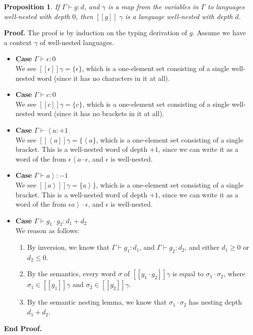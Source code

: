 \documentclass{article}
\newcommand{\lft}[1]{\left<{#1}\right.}
\newcommand{\rgt}[1]{\left.{#1}\right>}
\newcommand{\judgebalance}[3][\Gamma]{{#1} \vdash {#2} : {#3}}
\newcommand{\interp}[1]{[\![{#1}]\!]}
\newcommand{\setof}[1]{\{{#1}\}}
\newtheorem{prop}{Proposition}
\newenvironment{proof}{\noindent\textbf{Proof.}}
{\noindent\textbf{End Proof.}}
\newenvironment{caseblock}{\begin{itemize}}{\end{itemize}}
\newenvironment{case}[1]{\item \textbf{Case} {#1}\\}{}
\begin{document}
\begin{prop}
If $\judgebalance{g}{d}$, and $\gamma$ is a map from the variables in $\Gamma$ to 
languages well-nested with depth $0$, then $\interp{g}\;\gamma$ is a language well-nested 
with depth $d$. 
\end{prop}

\begin{proof}
The proof is by induction on the typing derivation of $g$. Assume we have a context $\gamma$ of well-nested
languages.

\begin{caseblock}
  \begin{case}{$\judgebalance{\epsilon}{0}$}
    We see $\interp{\epsilon}{\gamma} = \setof{\epsilon}$, which is a one-element set consisting 
    of a single well-nested word (since it has no characters in it at all). 
  \end{case}

  \begin{case}{$\judgebalance{c}{0}$}
    We see $\interp{c}{\gamma} = \setof{c}$, which is a one-element set consisting 
    of a single well-nested word (since it has no brackets in it at all). 
  \end{case}

  \begin{case}{$\judgebalance{\lft{a}}{+1}$}
    We see $\interp{\lft{a}}{\gamma} = \setof{\lft{a}}$, which is a one-element set consisting 
    of a single bracket. This is a well-nested word of depth $+1$, since we can write it as a 
    word of the from $\epsilon\lft{a}\cdot\epsilon$, and $\epsilon$ is well-nested. 
  \end{case}

  \begin{case}{$\judgebalance{\rgt{a}}{-1}$}
    We see $\interp{\rgt{a}}{\gamma} = \setof{\rgt{a}}$, which is a one-element set consisting 
    of a single bracket. This is a well-nested word of depth $+1$, since we can write it as a 
    word of the from $\epsilon\rgt{a}\cdot\epsilon$, and $\epsilon$ is well-nested. 
   \end{case}

  \begin{case}{$\judgebalance{g_1\cdot g_2}{d_1 + d_2}$}
    We reason as follows: 
    \begin{enumerate}
      \item By inversion, we know that $\judgebalance{g_1}{d_1}$, and $\judgebalance{g_2}{d_2}$, and either
        $d_1 \geq 0$ or $d_2 \leq 0$. 
      \item By the semantics, every word $\sigma$ of $\interp{g_1\cdot g_2}\gamma$ is equal to 
        $\sigma_1\cdot\sigma_2$, where $\sigma_1 \in \interp{g_1}\gamma$ and $\sigma_2 \in \interp{g_2}\gamma$. 
      \item By the semantic nesting lemma, we know that $\sigma_1 \cdot \sigma_2$ has nesting depth $d_1 + d_2$. 
    \end{enumerate}
  \end{case}


\end{caseblock}
\end{proof}
\end{document}
